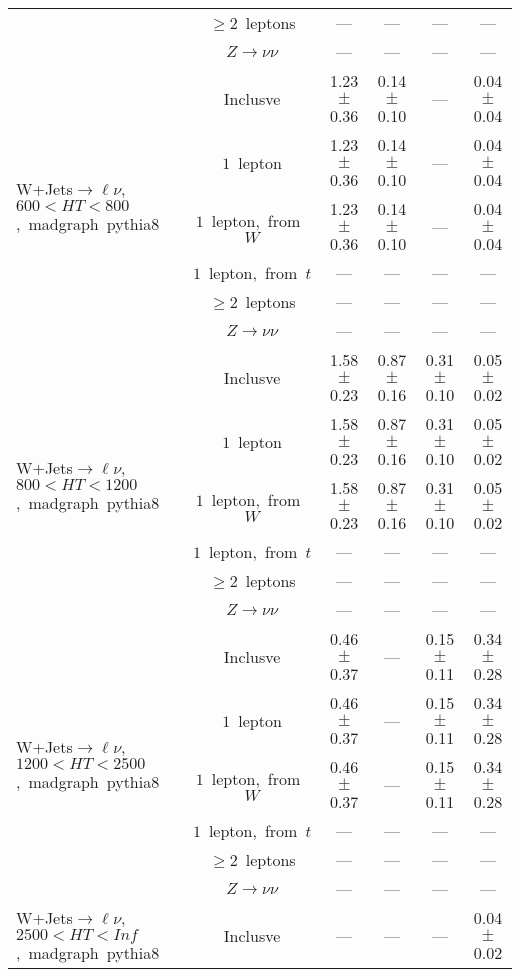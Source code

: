 \documentclass{article}
\begin{document}
\begin{longtable}{|l|c|c|c|c|c|}
 & $\ge2$~leptons  & ---  & ---  & ---  & --- \\* 
 & $Z\rightarrow\nu\nu$  & ---  & ---  & ---  & --- \\* 
\hline 
\multirow{6}{*}{W+Jets$\rightarrow\ell\nu$,~$600<HT<800$,~madgraph~pythia8} & Inclusve  & 1.23 $\pm$ 0.36  & 0.14 $\pm$ 0.10  & ---  & 0.04 $\pm$ 0.04 \\* 
 & $1$~lepton  & 1.23 $\pm$ 0.36  & 0.14 $\pm$ 0.10  & ---  & 0.04 $\pm$ 0.04 \\* 
 & $1$~lepton,~from~$W$  & 1.23 $\pm$ 0.36  & 0.14 $\pm$ 0.10  & ---  & 0.04 $\pm$ 0.04 \\* 
 & $1$~lepton,~from~$t$  & ---  & ---  & ---  & --- \\* 
 & $\ge2$~leptons  & ---  & ---  & ---  & --- \\* 
 & $Z\rightarrow\nu\nu$  & ---  & ---  & ---  & --- \\* 
\hline 
\multirow{6}{*}{W+Jets$\rightarrow\ell\nu$,~$800<HT<1200$,~madgraph~pythia8} & Inclusve  & 1.58 $\pm$ 0.23  & 0.87 $\pm$ 0.16  & 0.31 $\pm$ 0.10  & 0.05 $\pm$ 0.02 \\* 
 & $1$~lepton  & 1.58 $\pm$ 0.23  & 0.87 $\pm$ 0.16  & 0.31 $\pm$ 0.10  & 0.05 $\pm$ 0.02 \\* 
 & $1$~lepton,~from~$W$  & 1.58 $\pm$ 0.23  & 0.87 $\pm$ 0.16  & 0.31 $\pm$ 0.10  & 0.05 $\pm$ 0.02 \\* 
 & $1$~lepton,~from~$t$  & ---  & ---  & ---  & --- \\* 
 & $\ge2$~leptons  & ---  & ---  & ---  & --- \\* 
 & $Z\rightarrow\nu\nu$  & ---  & ---  & ---  & --- \\* 
\hline 
\multirow{6}{*}{W+Jets$\rightarrow\ell\nu$,~$1200<HT<2500$,~madgraph~pythia8} & Inclusve  & 0.46 $\pm$ 0.37  & ---  & 0.15 $\pm$ 0.11  & 0.34 $\pm$ 0.28 \\* 
 & $1$~lepton  & 0.46 $\pm$ 0.37  & ---  & 0.15 $\pm$ 0.11  & 0.34 $\pm$ 0.28 \\* 
 & $1$~lepton,~from~$W$  & 0.46 $\pm$ 0.37  & ---  & 0.15 $\pm$ 0.11  & 0.34 $\pm$ 0.28 \\* 
 & $1$~lepton,~from~$t$  & ---  & ---  & ---  & --- \\* 
 & $\ge2$~leptons  & ---  & ---  & ---  & --- \\* 
 & $Z\rightarrow\nu\nu$  & ---  & ---  & ---  & --- \\* 
\hline 
\multirow{6}{*}{W+Jets$\rightarrow\ell\nu$,~$2500<HT<Inf$,~madgraph~pythia8} & Inclusve  & ---  & ---  & ---  & 0.04 $\pm$ 0.02 \\* 

\end{longtable}
\end{document}
